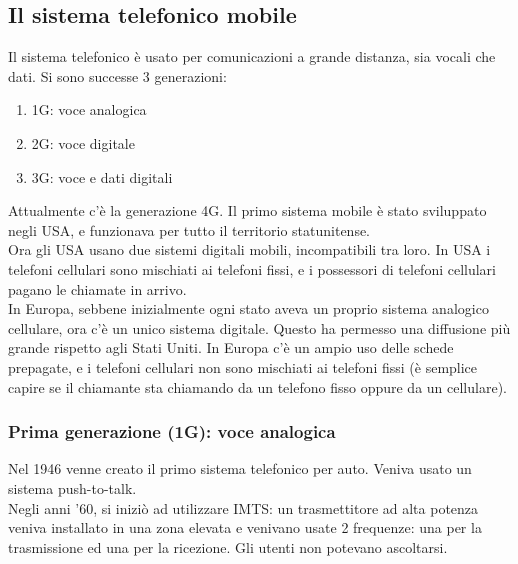 \documentclass{article}
\begin{document}
	\subsection{Il sistema telefonico mobile}
	Il sistema telefonico è usato per comunicazioni a grande distanza, sia vocali che dati. Si sono successe 3 generazioni:
	\begin{enumerate}
		\item 1G: voce analogica
		\item 2G: voce digitale
		\item 3G: voce e dati digitali 
	\end{enumerate}
	Attualmente c'è la generazione 4G.
	Il primo sistema mobile è stato sviluppato negli USA, e funzionava per tutto il territorio statunitense.\\ Ora gli USA usano due sistemi digitali mobili, incompatibili tra loro. In USA i telefoni cellulari sono mischiati ai telefoni fissi, e i possessori di telefoni cellulari pagano le chiamate in arrivo.\\
	In Europa, sebbene inizialmente ogni stato aveva un proprio sistema analogico cellulare, ora c'è un unico sistema digitale. Questo ha permesso una diffusione più grande rispetto agli Stati Uniti. In Europa c'è un ampio uso delle schede prepagate, e i telefoni cellulari non sono mischiati ai telefoni fissi (è semplice capire se il chiamante sta chiamando da un telefono fisso oppure da un cellulare).
	\subsubsection{Prima generazione (1G): voce analogica}
	Nel 1946 venne creato il primo sistema telefonico per auto.
	Veniva usato un sistema push-to-talk.\\
	Negli anni '60, si iniziò ad utilizzare IMTS: un trasmettitore ad alta potenza veniva installato in una zona elevata e venivano usate 2 frequenze: una per la trasmissione ed una per la ricezione. Gli utenti non potevano ascoltarsi.
\end{document}
